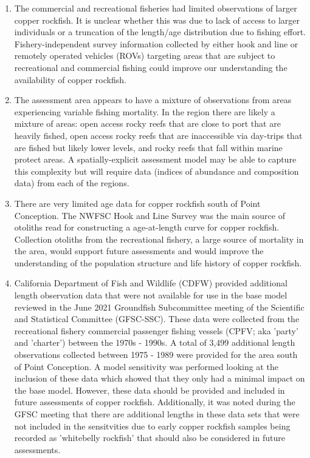 \documentclass[11pt,
  english,
  a4paper,
]{article}
\begin{document}
\begin{enumerate}

    \item The commercial and recreational fisheries had limited observations of larger copper rockfish.  It is unclear whether this was due to lack of access to larger individuals or a truncation of the length/age distribution due to fishing effort. Fishery-independent survey information collected by either hook and line or remotely operated vehicles (ROVs) targeting areas that are subject to recreational and commercial fishing could improve our understanding the availability of copper rockfish.

    \item The assessment area appears to have a mixture of observations from areas experiencing variable fishing mortality. In the region there are likely a mixture of areas: open access rocky reefs that are close to port that are heavily fished, open access rocky reefs that are inaccessible via day-trips that are fished but likely lower levels, and rocky reefs that fall within marine protect areas.  A spatially-explicit assessment model may be able to capture this complexity but will require data (indices of abundance and composition data) from each of the regions. 

    \item There are very limited age data for copper rockfish south of Point Conception. The NWFSC Hook and Line Survey was the main source of otoliths read for constructing a age-at-length curve for copper rockfish. Collection otoliths from the recreational fishery, a large source of mortality in the area, would support future assessments  and would improve the understanding of the population structure and life history of copper rockfish. 

    \item California Department of Fish and Wildlife (CDFW) provided additional length observation data that were not available for use in the base model reviewed in the June 2021 Groundfish Subcommittee meeting of the Scientific and Statistical Committee (GFSC-SSC).  These data were collected from the recreational fishery commercial passenger fishing vessels (CPFV; aka 'party' and 'charter') between the 1970s - 1990s. A total of 3,499 additional length observations collected between 1975 - 1989 were provided for the area south of Point Conception. A model sensitivity was performed looking at the inclusion of these data which showed that they only had a minimal impact on the base model. However, these data should be provided and included in future assessments of copper rockfish.  Additionally, it was noted during the GFSC meeting that there are additional lengths in these data sets that were not included in the sensitvities due to early copper rockfish samples being recorded as 'whitebelly rockfish' that should also be considered in future assessments. 

\end{enumerate}
\end{document}
